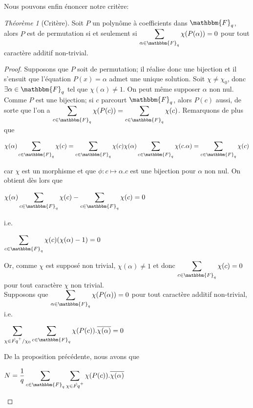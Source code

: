 \documentclass[12pt]{article}
\theoremstyle{remark}\newtheorem{note}{Note}
\theoremstyle{remark}\newtheorem{nota}{Notation}
\newcommand{\Fq}{\mathbbm{F}_q}
\newtheorem{theorem}{Théorème}
\theoremstyle{definition}
\begin{document}
Nous pouvons enfin énoncer notre critère:

\begin{theorem}[Critère]
Soit $P$ un polynôme à coefficients dans $\Fq$, alors $P$ est de permutation si et seulement si $\displaystyle\sum_{\alpha \in \Fq} \chi(P(\alpha)) = 0$ pour tout caractère additif non-trivial.
\end{theorem}

\begin{proof}
	\fbox{$\Rightarrow$} Supposons que $P$ soit de permutation; il réalise donc une bijection et il s'ensuit que l'équation $P(x) = \alpha$ admet une unique solution. Soit $\chi \neq \chi_0$, donc $\exists \alpha \in \Fq$ tel que $\chi(\alpha)\neq 1$. On peut même supposer $\alpha$ non nul. Comme $P$ est une bijection; si $c$ parcourt $\Fq$, alors $P(c)$ aussi, de sorte que l'on a $\displaystyle\sum_{c\in\Fq}\chi(P(c)) = \displaystyle\sum_{c\in\Fq}\chi(c)$. \newline
Remarquons de plus que
\begin{center}$\chi(\alpha)\displaystyle\sum_{c\in\Fq}\chi(c) = \displaystyle\sum_{c\in\Fq}\chi(c)\chi(\alpha) \displaystyle\sum_{c\in\Fq}\chi(c.\alpha) =\displaystyle\sum_{c\in\Fq}\chi(c)$\end{center}
car $\chi$ est un morphisme et que $\phi :c \longmapsto \alpha.c$ est une bijection pour $\alpha$ non nul.
On obtient dès lors que
\begin{center} 
$\chi(\alpha)\displaystyle\sum_{c\in\Fq}\chi(c) - \displaystyle\sum_{c\in\Fq}\chi(c) =0$
\end{center}
i.e.
\begin{center}
$\displaystyle\sum_{c\in\Fq}\chi(c)(\chi(\alpha) -1) = 0$
\end{center}
Or, comme $
\chi$ est supposé non trivial, $\chi(\alpha) \neq 1$ et donc $\displaystyle\sum_{c\in\Fq}\chi(c) = 0$ pour tout caractère $\chi$ non trivial.\\
 \fbox{$\Leftarrow$} Supposons que $\displaystyle\sum_{\alpha \in \Fq} \chi(P(\alpha)) = 0$ pour tout caractère additif non-trivial, i.e. 
		\begin{center} $\displaystyle	\sum_{\chi \in \hat{Fq}^+/\chi_0} \sum_{c\in\Fq} \chi(P(c)).\overline{\chi(\alpha)}=0$ \end{center}
De la proposition précédente, nous avons que 
\begin{center} $N = \displaystyle \frac{1}{q} \sum_{c\in\Fq}\sum_{\chi \in \hat{Fq}^+} \chi(P(c)).\overline{\chi(\alpha)}$ \end{center}

\end{proof}
\end{document}
